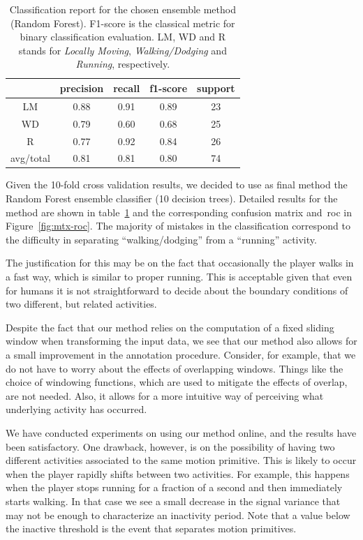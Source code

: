 \begin{table}[h]\footnotesize
  \centering
  \caption{Classification report for the chosen ensemble method (Random Forest). F1-score is the classical metric for binary classification evaluation. LM, WD and R stands for \textit{Locally Moving}, \textit{Walking/Dodging} and \textit{Running}, respectively.
  }
  \begin{tabular}{| c | c | c | c | c |}
    \hline
  	   & precision   & recall & f1-score &  support \\\hline
    LM &      0.88   &  0.91  &    0.89  &      23  \\\hline
    WD &      0.79   &  0.60 &     0.68 &       25  \\\hline
     R &      0.77   &  0.92 &     0.84 &       26  \\\hline
avg/total &   0.81   &  0.81 &     0.80 &       74  \\\hline
  \end{tabular}
  \label{report}
\end{table}

Given the 10-fold cross validation results, we decided to use as final method the Random Forest ensemble classifier (10 decision trees). Detailed results for the method are shown in table~\ref{report} and the corresponding confusion matrix and~\gls{roc} in Figure~\ref{fig:mtx-roc}. The majority of mistakes in the classification correspond to the difficulty in separating ``walking/dodging'' from  a ``running'' activity. 

The justification for this may be on the fact that occasionally the player walks in a fast way, which is similar to proper running. This is acceptable given that even for humans it is not straightforward to decide about the boundary conditions of two different, but related activities.

Despite the fact that our method relies on the computation of a fixed sliding window when transforming the input data, we see that our method also allows for a small improvement in the annotation procedure. Consider, for example, that we do not have to worry about the effects of overlapping windows. Things like the choice of windowing functions, which are used to mitigate the effects of overlap, are not needed. Also, it allows for a more intuitive way of perceiving what underlying activity has occurred.

We have conducted experiments on using our method online, and the results have been satisfactory. One drawback, however, is on the possibility of having two different activities associated to the same motion primitive. This is likely to occur when the player rapidly shifts between two activities. For example, this happens when the player stops running for a fraction of a second and then immediately starts walking. In that case we see a small decrease in the signal variance that may not be enough to characterize an inactivity period. Note that a value below the inactive threshold is the event that separates motion primitives.

